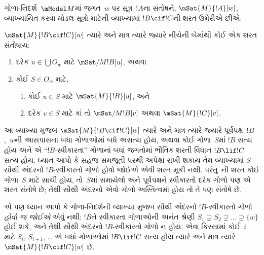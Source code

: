 ગોળા-નિદર્શ~$\mModel M$માં જગત~$w$ પર સૂત્ર~$!A$ના સંતોષને,
$\mSat{M}{!A}[w]$, વ્યાખ્યાયિત કરવા મોડલ સૂત્રો માટેની
વ્યાખ્યામાં $!B \cif !C$ની શરત ઉમેરીએ છીએ:

\begin{defn}
  $\mSat{M}{!B \cif !C}[w]$ ત્યારે અને માત્ર ત્યારે જ્યારે નીચેની
  બેમાંથી કોઈ એક શરત સંતોષાય:
  \begin{enumerate}
  \item{} દરેક $u \in \bigcup O_w$ માટે $\mSat/{M}{!B}[u]$, અથવા
  \item{} કોઈ $S \in O_w$ માટે,
    \begin{enumerate}
      \item કોઈ $u \in
        S$ માટે $\mSat{M}{!B}[u]$, અને
      \item દરેક $v \in S$ માટે કાં તો
        $\mSat/{M}{!B}[v]$ અથવા $\mSat{M}{!C}[v]$.
    \end{enumerate}
  \end{enumerate}
\end{defn}

આ વ્યાખ્યા મુજબ $\mSat{M}{!B \cif !C}[w]$ ત્યારે અને માત્ર ત્યારે
જ્યારે પૂર્વપક્ષ~$!B$,~$w$ની આસપાસના બધા ગોળાઓમાં બધે અસત્ય હોય,
અથવા કોઈ ગોળા~$S$માં $!B$ સત્ય હોય અને એ ``$!B$-સ્વીકારતા''
ગોળાનાં બધાં જગતોમાં ભૌતિક શરતી વિધાન $!B \lif !C$ સત્ય હોય.
ધ્યાન આપો કે સહજ સમજૂતી પરથી અપેક્ષા રાખી શકાય તેમ વ્યાખ્યામાં
$S$ સૌથી અંદરનો $!B$-સ્વીકારતો ગોળો હોવો જોઈએ એવી શરત મૂકી
નથી. પરંતુ~ની શરત કોઈ ગોળા~$S$ માટે સાચી
હોય, તો~$S$માં સમાયેલો અને પૂર્વપક્ષને સ્વીકારતો દરેક ગોળો પણ એ
શરત સંતોષે છે; તેથી સૌથી અંદરનો એવો ગોળો અસ્તિત્વમાં
હોય તો તે પણ સંતોષે છે.

એ પણ ધ્યાન આપો કે ગોળા-નિદર્શની વ્યાખ્યા મુજબ સૌથી અંદરનો
$!B$-સ્વીકારતો ગોળો \emph{હોવો જ જોઈએ} એવું નથી: $!B$ને સ્વીકારતા
ગોળાઓની અનંત શ્રેણી $S_1 \supsetneq S_2 \supsetneq \dots \supsetneq
\{w\}$ હોઈ શકે, અને તેથી સૌથી અંદરનો $!B$-સ્વીકારતો ગોળો ન હોય.
એવા કિસ્સામાં કોઈ~$i$ માટે $S_i$, $S_{i+1}$, \dots{} એ બધાં ગોળાઓમાં
$!B \lif !C$ સત્ય હોય ત્યારે અને માત્ર ત્યારે
$\mSat{M}{!B \cif !C}[w]$ છે.
\endgroup


\begingroup
\makeatletter{}\makeatother


\label{guunit:OLP-0525}


